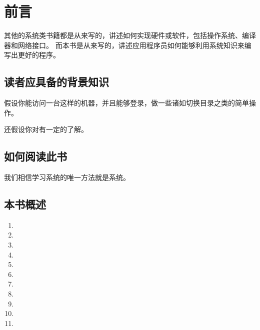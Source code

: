 
\chapter{前言}
{
    其他的系统类书籍都是从来写的，讲述如何实现硬件或软件，包括操作系统、编译器和网络接口。
    而本书是从来写的，讲述应用程序员如何能够利用系统知识来编写出更好的程序。

    \section{读者应具备的背景知识}
    {
        假设你能访问一台这样的机器，并且能够登录，做一些诸如切换目录之类的简单操作。

        还假设你对有一定的了解。
    }

    \section{如何阅读此书}
    {
        我们相信学习系统的唯一方法就是系统。
    }

    \section{本书概述}
    {
        \begin{enumerate}[第1章：]
            \item {}
            \item {}
            \item {}
            \item {}
            \item {}
            \item {}
            \item {}
            \item {}
            \item {}
            \item {}
            \item {}
        \end{enumerate}
    }
}

\cleardoublepage

\endinput
